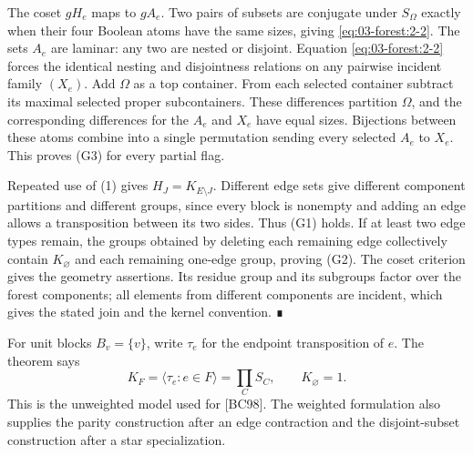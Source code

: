 The coset \(gH_e\) maps to \(gA_e\). Two pairs of subsets are conjugate under \(S_\Omega\) exactly when their four Boolean atoms have the same sizes, giving \eqref{eq:03-forest:2-2}. The sets \(A_e\) are laminar: any two are nested or disjoint. Equation \eqref{eq:03-forest:2-2} forces the identical nesting and disjointness relations on any pairwise incident family \((X_e)\). Add \(\Omega\) as a top container. From each selected container subtract its maximal selected proper subcontainers. These differences partition \(\Omega\), and the corresponding differences for the \(A_e\) and \(X_e\) have equal sizes. Bijections between these atoms combine into a single permutation sending every selected \(A_e\) to \(X_e\). This proves (G3) for every partial flag.

Repeated use of (1) gives \(H_J=K_{E\setminus J}\). Different edge sets give different component partitions and different groups, since every block is nonempty and adding an edge allows a transposition between its two sides. Thus (G1) holds. If at least two edge types remain, the groups obtained by deleting each remaining edge collectively contain \(K_\varnothing\) and each remaining one-edge group, proving (G2). The coset criterion gives the geometry assertions. Its residue group and its subgroups factor over the forest components; all elements from different components are incident, which gives the stated join and the kernel convention. ∎

For unit blocks \(B_v=\{v\}\), write \(\tau_e\) for the endpoint transposition of \(e\). The theorem says \begin{equation}
K_F=\langle\tau_e:e\in F\rangle
 =\prod_C S_C,\qquad K_\varnothing=1.
\label{eq:03-forest:2-3}
\end{equation} This is the unweighted model used for {[}BC98{]}. The weighted formulation also supplies the parity construction after an edge contraction and the disjoint-subset construction after a star specialization.
